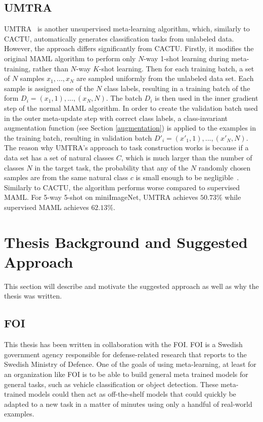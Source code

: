 \subsection{UMTRA}
\Gls{UMTRA}~\cite{unsup-maml-rand} is another unsupervised meta-learning algorithm, which, similarly to CACTU, automatically generates classification tasks from unlabeled data. However, the approach differs significantly from CACTU. Firstly, it modifies the original \gls{MAML} algorithm to perform only $N$-way 1-shot learning during meta-training, rather than $N$-way $K$-shot learning. Then for each training batch, a set of $N$ samples $x_1,...,x_N$ are sampled uniformly from the unlabeled data set. Each sample is assigned one of the $N$ class labels, resulting in a training batch of the form $D_i = (x_1, 1),...,(x_N, N)$. The batch $D_i$ is then used in the inner gradient step of the normal \gls{MAML} algorithm. In order to create the validation batch used in the outer meta-update step with correct class labels, a class-invariant augmentation function (see Section \ref{augmentation}) is applied to the examples in the training batch, resulting in validation batch $D'_i = (x'_1, 1), ...,(x'_N, N)$. The reason why UMTRA's approach to task construction works is because if a data set has a set of natural classes $C$, which is much larger than the number of classes $N$ in the target task, the probability that any of the $N$ randomly chosen samples are from the same natural class $c$ is small enough to be negligible~\cite{unsup-maml-rand}. Similarly to \gls{CACTU}, the algorithm performs worse compared to supervised \gls{MAML}. For 5-way 5-shot on miniImageNet, \gls{UMTRA} achieves $50.73\%$ while supervised \gls{MAML} achieves $62.13\%$.

\section{Thesis Background and Suggested Approach}\label{approach}
This section will describe and motivate the suggested approach as well as why the thesis was written.

\subsection{FOI}
This thesis has been written in collaboration with the \gls{FOI}. \Gls{FOI} is a Swedish government agency responsible for defense-related research that reports to the Swedish Ministry of Defence. One of the goals of using meta-learning, at least for an organization like \gls{FOI} is to be able to build general meta trained models for general tasks, such as vehicle classification or object detection. These meta-trained models could then act as off-the-shelf models that could quickly be adapted to a new task in a matter of minutes using only a handful of real-world examples. 

